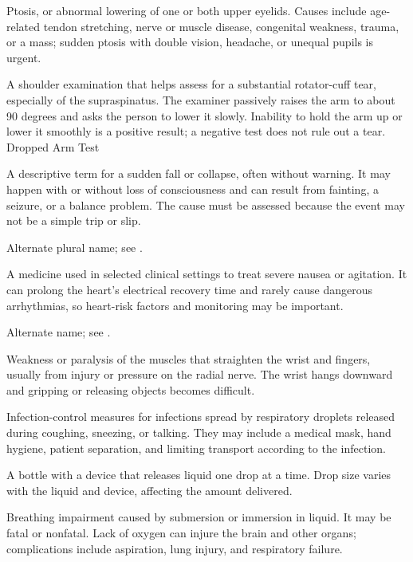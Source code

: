  Ptosis, or abnormal lowering of one or both upper eyelids. Causes include age-related tendon stretching, nerve or muscle disease, congenital weakness, trauma, or a mass; sudden ptosis with double vision, headache, or unequal pupils is urgent.

 A shoulder examination that helps assess for a substantial
rotator-cuff tear, especially of the supraspinatus. The examiner passively raises the arm
to about 90 degrees and asks the person to lower it slowly. Inability to hold the arm up
or lower it smoothly is a positive result; a negative test does not rule out a tear.
\synonyms
Dropped Arm Test

 A descriptive term for a sudden fall or collapse, often without warning.
It may happen with or without loss of consciousness and can result from fainting, a seizure, or a balance problem. The cause must be assessed because the event may not be a simple trip or slip.

 Alternate plural name; see .

 A medicine used in selected clinical settings to treat severe nausea or agitation. It can prolong the heart’s electrical recovery time and rarely cause dangerous arrhythmias, so heart-risk factors and monitoring may be important.

 Alternate name; see .

 Weakness or paralysis of the muscles that straighten the wrist and fingers, usually from injury or pressure on the radial nerve. The wrist hangs downward and gripping or releasing objects becomes difficult.

 Infection-control measures for infections spread by respiratory droplets released during coughing, sneezing, or talking. They may include a medical mask, hand hygiene, patient separation, and limiting transport according to the infection.

 A bottle with a device that releases liquid one drop at a time. Drop size varies with the liquid and device, affecting the amount delivered.

 Breathing impairment caused by submersion or immersion in liquid. It may be fatal or nonfatal. Lack of oxygen can injure the brain and other organs; complications include aspiration, lung injury, and respiratory failure.

